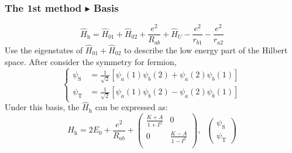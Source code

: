 \documentclass{beamer}
\begin{document}
  \begin{frame}
    \frametitle{The 1st method \(\blacktriangleright\) Basis}
    \begin{equation*}
        \widehat{H}_{\text{h}} = \widehat{H}_{01} + \widehat{H}_{02} + \dfrac{e^2}{R_{ab}} + \widehat{H}_U - \dfrac{e^2}{r_{b1}} - \dfrac{e^2}{r_{a2}}
    \end{equation*}
    Use the eigenstates of \(\widehat{H}_{01} + \widehat{H}_{02}\) to describe the low energy part of the Hilbert space. After consider the symmetry for fermion, 
    \begin{equation}
      \begin{cases}
        \psi_{\text{S}} &= \frac{1}{\sqrt{2}}\left[\psi_a(1)\psi_b(2) + \psi_a(2)\psi_b(1)\right]\\
        \psi_{\text{T}} &= \frac{1}{\sqrt{2}}\left[\psi_a(1)\psi_b(2) - \psi_a(2)\psi_b(1)\right]
      \end{cases}
    \end{equation}
    Under this basis, the \(\widehat{H}_{\text{h}}\) can be expressed as:
    \begin{equation}
      \widehat{H}_{\text{h}} = 2E_0 + \dfrac{e^2}{R_{ab}} + \begin{pmatrix}
        \frac{K+A}{1+I^2} & 0 \\
        0 & \frac{K-A}{1-I^2}\\
      \end{pmatrix}, \;\;\begin{pmatrix}
        \psi_{\text{S}}\\[0.6em]
        \psi_{\text{T}}
      \end{pmatrix}
    \end{equation}
  \end{frame}
\end{document}

